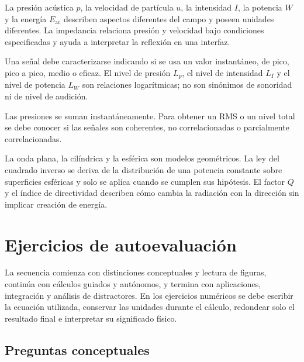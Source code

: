 La presión acústica \(p\), la velocidad de partícula \(u\), la intensidad
\(I\), la potencia \(W\) y la energía \(E_\mathrm{ac}\) describen aspectos
diferentes del campo y poseen unidades diferentes. La impedancia relaciona
presión y velocidad bajo condiciones especificadas y ayuda a interpretar la
reflexión en una interfaz.

Una señal debe caracterizarse indicando si se usa un valor instantáneo, de
pico, pico a pico, medio o eficaz. El nivel de presión \(L_p\), el nivel de
intensidad \(L_I\) y el nivel de potencia \(L_W\) son relaciones logarítmicas;
no son sinónimos de sonoridad ni de nivel de audición.

Las presiones se suman instantáneamente. Para obtener un RMS o un nivel total
se debe conocer si las señales son coherentes, no correlacionadas o
parcialmente correlacionadas.

La onda plana, la cilíndrica y la esférica son modelos geométricos. La ley del
cuadrado inverso se deriva de la distribución de una potencia constante sobre
superficies esféricas y solo se aplica cuando se cumplen sus hipótesis. El
factor \(Q\) y el índice de directividad describen cómo cambia la radiación
con la dirección sin implicar creación de energía.

\section{Ejercicios de autoevaluación}
\label{sec:u4-ejercicios}

La secuencia comienza con distinciones conceptuales y lectura de figuras,
continúa con cálculos guiados y autónomos, y termina con aplicaciones,
integración y análisis de distractores. En los ejercicios numéricos se debe
escribir la ecuación utilizada, conservar las unidades durante el cálculo,
redondear solo el resultado final e interpretar su significado físico.

\subsection*{Preguntas conceptuales}

